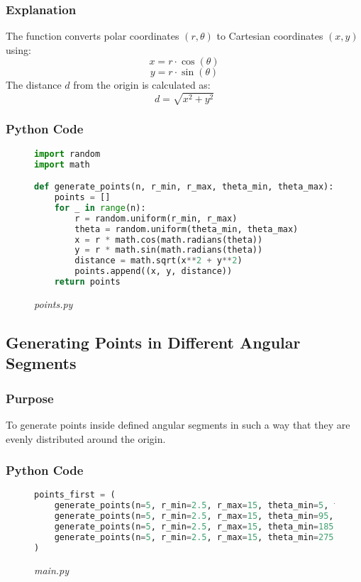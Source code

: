 \documentclass[12pt,a4paper]{report}
\begin{document}
\subsubsection{Explanation}
The function converts polar coordinates \((r, \theta)\) to Cartesian coordinates \((x, y)\) using:
\[
x = r \cdot \cos(\theta)
\]
\[
y = r \cdot \sin(\theta)
\]
The distance $d$ from the origin is calculated as:
\[
d = \sqrt{x^2 + y^2}
\]


\vspace*{\fill}\newpage

\subsubsection{Python Code}
\begin{figure}[ht!]
\centering
\caption*{\large\textit{points.py}}
\begin{lstlisting}[language=Python, caption={Function to Generate Points}]
import random
import math

def generate_points(n, r_min, r_max, theta_min, theta_max):
    points = []
    for _ in range(n):
        r = random.uniform(r_min, r_max)
        theta = random.uniform(theta_min, theta_max)
        x = r * math.cos(math.radians(theta))
        y = r * math.sin(math.radians(theta))
        distance = math.sqrt(x**2 + y**2)
        points.append((x, y, distance))
    return points
\end{lstlisting}
\end{figure}


\subsection{Generating Points in Different Angular Segments}

\subsubsection{Purpose}
To generate points inside defined angular segments in such a way that they are evenly distributed around the origin.


\subsubsection{Python Code}
\begin{figure}[ht!]
\centering
\caption*{\large\textit{main.py}}
\begin{lstlisting}[language=Python, caption={Generating Points in Different Angular Segments}]
points_first = (
    generate_points(n=5, r_min=2.5, r_max=15, theta_min=5, theta_max=85) +
    generate_points(n=5, r_min=2.5, r_max=15, theta_min=95, theta_max=175) +
    generate_points(n=5, r_min=2.5, r_max=15, theta_min=185, theta_max=265) +
    generate_points(n=5, r_min=2.5, r_max=15, theta_min=275, theta_max=355)
)
\end{lstlisting}
\end{figure}
\end{document}
